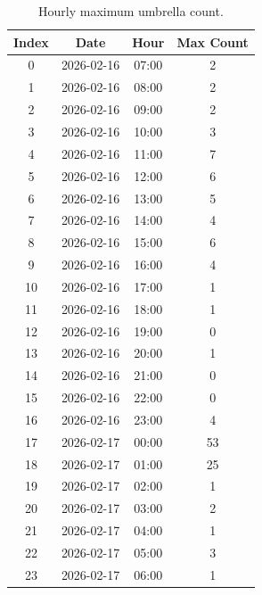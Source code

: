 \documentclass{article}
\begin{document}
\begin{table}[htbp]
\centering
\caption{Hourly maximum umbrella count.}
\begin{tabular}{cccc}
\toprule
\textbf{Index} & \textbf{Date} & \textbf{Hour} & \textbf{Max Count} \\
\midrule
0  & 2026-02-16 & 07:00 & 2 \\
1  & 2026-02-16 & 08:00 & 2 \\
2  & 2026-02-16 & 09:00 & 2 \\
3  & 2026-02-16 & 10:00 & 3 \\
4  & 2026-02-16 & 11:00 & 7 \\
5  & 2026-02-16 & 12:00 & 6 \\
6  & 2026-02-16 & 13:00 & 5 \\
7  & 2026-02-16 & 14:00 & 4 \\
8  & 2026-02-16 & 15:00 & 6 \\
9  & 2026-02-16 & 16:00 & 4 \\
10 & 2026-02-16 & 17:00 & 1 \\
11 & 2026-02-16 & 18:00 & 1 \\
12 & 2026-02-16 & 19:00 & 0 \\
13 & 2026-02-16 & 20:00 & 1 \\
14 & 2026-02-16 & 21:00 & 0 \\
15 & 2026-02-16 & 22:00 & 0 \\
16 & 2026-02-16 & 23:00 & 4 \\
17 & 2026-02-17 & 00:00 & 53 \\
18 & 2026-02-17 & 01:00 & 25 \\
19 & 2026-02-17 & 02:00 & 1 \\
20 & 2026-02-17 & 03:00 & 2 \\
21 & 2026-02-17 & 04:00 & 1 \\
22 & 2026-02-17 & 05:00 & 3 \\
23 & 2026-02-17 & 06:00 & 1 \\
\bottomrule
\end{tabular}
\end{table}
\end{document}
